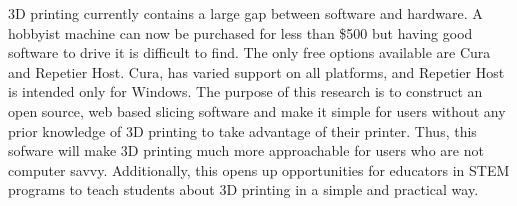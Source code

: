 
3D printing currently contains a large gap between software and hardware. 
A hobbyist machine can now be purchased for less than \$500 but having good software to drive it is difficult to find. 
The only free options available are Cura and Repetier Host. 
Cura, has varied support on all platforms, and Repetier Host is intended only for Windows. 
The purpose of this research is to construct an open source, web based slicing software and make it simple for users without any prior knowledge of 3D printing to take advantage of their printer.
Thus, this sofware will make 3D printing much more approachable for users who are not computer savvy. 
Additionally, this opens up opportunities for educators in STEM programs to teach students about 3D printing in a simple and practical way.
